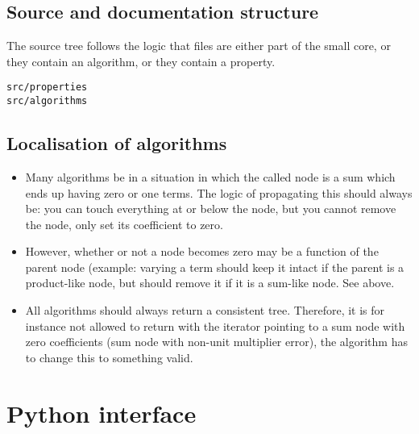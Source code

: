 \documentclass[11pt]{article}
\begin{document}
\subsection{Source and documentation structure}

The source tree follows the logic that files are either part of the
small core, or they contain an algorithm, or they contain a property. 
\begin{verbatim}
src/properties
src/algorithms
\end{verbatim}

\subsection{Localisation of algorithms}

\begin{itemize}
\item Many algorithms be in a situation in which the called
  node is a sum which ends up having zero or one terms. The logic of
  propagating this should always be: you can touch everything at or
  below the node, but you cannot remove the node, only set its
  coefficient to zero. 

\item However, whether or not a node becomes zero may be a function of
  the parent node (example: varying a term should keep it intact if
  the parent is a product-like node, but should remove it if it is a
  sum-like node. See above.

\item All algorithms should always return a consistent
  tree. Therefore, it is for instance not allowed to return with the
  iterator pointing to a sum node with zero coefficients (sum node
  with non-unit multiplier error), the algorithm has to change this to
  something valid.

\end{itemize}


%

\section{Python interface}
\end{document}

